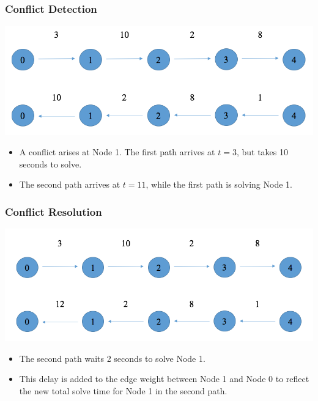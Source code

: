 \documentclass[xcolor={usenames,dvipsnames,svgnames,table}]{beamer}
\begin{document}
\begin{frame}[t]\frametitle{Conflict Detection}
	\centering
 	\includegraphics[scale=0.35]{figures/preconflict.png}
	
	\begin{block}{}
		\begin{itemize}
			\item A conflict arises at Node 1. The first path arrives at $t=3$, but takes 10 seconds to solve.
			\item The second path arrives at $t= 11$, while the first path is solving Node 1.
		\end{itemize}
	\end{block}
\end{frame}

\begin{frame}[t]\frametitle{Conflict Resolution}
	\centering
	\includegraphics[scale=0.35]{figures/postconflict.png}
	
	\begin{block}{}
	\begin{itemize}
		\item The second path waits 2 seconds to solve Node 1.
		\item This delay is added to the edge weight between Node 1 and Node 0 to reflect the new total solve time for Node 1 in the second path.
	\end{itemize}
	\end{block}
	
\end{frame}
\end{document}
